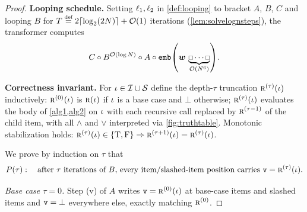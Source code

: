 \documentclass{article}
\begin{document}
\begin{proof}
        \textbf{Looping schedule.}
        Setting ${\ell}_1, {\ell}_2$ in \cref{def:looping} to bracket $A$, $B$, $C$ and looping $B$ for $T \defeq 2 \lceil \log_2(2\idxn) \rceil + \bigo(1)$ iterations (\cref{lem:solvelognsteps}), the transformer computes
        \begin{equation*}
            C \circ B^{\bigo(\log \idxn)} \circ A \circ \embedFunc\mleft(\str\,\underbrace{\paddingtoken \cdots \paddingtoken}_{\bigo(\idxn^6)}\mright).
        \end{equation*}
        
        \textbf{Correctness invariant.}
        For ${{ \iota}} \in {{\mathcal{I}}} \cup {{\mathcal{S}}}$ define the depth-$\tau$ truncation ${\textsc{r}}^{(\tau)}({{ \iota}})$ inductively: ${\textsc{r}}^{(0)}({{ \iota}})$ is ${\textsc{r}}({{ \iota}})$ if ${{ \iota}}$ is a base case and $\bot$ otherwise; ${\textsc{r}}^{(\tau)}({{ \iota}})$ evaluates the body of \cref{alg1,alg2} on ${{ \iota}}$ with each recursive call replaced by ${\textsc{r}}^{(\tau - 1)}$ of the child item, with all $\land$ and $\lor$ interpreted via \cref{fig:truthtable}.
        Monotonic stabilization holds: ${\textsc{r}}^{(\tau)}({{ \iota}}) \in {{\{ {\mathbin{\mathrm{T}}}, {\mathbin{\mathrm{F}}}\}}} \Rightarrow {\textsc{r}}^{(\tau+1)}({{ \iota}}) = {\textsc{r}}^{(\tau)}({{ \iota}})$.
        
        We prove by induction on $\tau$ that
        \begin{equation*}
            P(\tau): \quad \text{after $\tau$ iterations of $B$, every item/slashed-item position carries } {\mathtt{v}} = {\textsc{r}}^{(\tau)}({{ \iota}}).
        \end{equation*}
        
        \emph{Base case $\tau = 0$.} Step (v) of $A$ writes ${\mathtt{v}} = {\textsc{r}}^{(0)}({{ \iota}})$ at base-case items and slashed items and ${\mathtt{v}} = \bot$ everywhere else, exactly matching ${\textsc{r}}^{(0)}$.
        

\end{proof}
\end{document}
